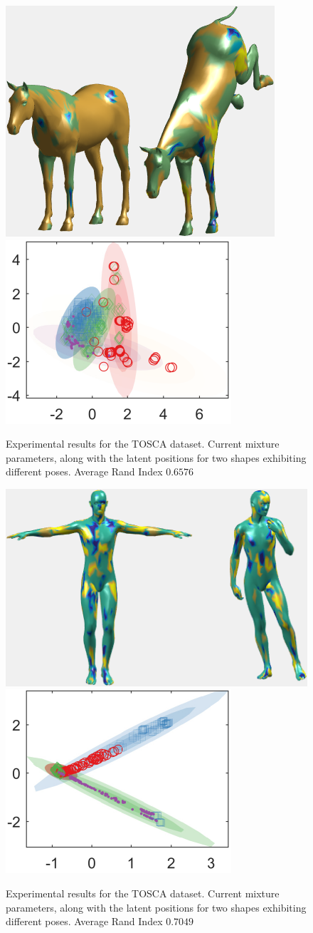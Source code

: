 \documentclass[]{article}
\begin{document}
\begin{figure}[ht!]
	\centering
	
	\includegraphics[width=0.55\linewidth]{img/horseMVMMexp1}
	\includegraphics[width=0.35\linewidth]{img/horseMVMMexp3}
	\caption{Experimental results for the TOSCA dataset. Current mixture parameters, along with the latent positions for two shapes exhibiting different poses. Average Rand Index $0.6576$ }
\end{figure}

\begin{figure}[ht!]
	\centering
	
	\includegraphics[width=0.55\linewidth]{img/davidMVMMexp1}
	\includegraphics[width=0.35\linewidth]{img/davidMVMMexp3}
	\caption{Experimental results for the TOSCA dataset. Current mixture parameters, along with the latent positions for two shapes exhibiting different poses. Average Rand Index $0.7049$ }
\end{figure}
\end{document}
